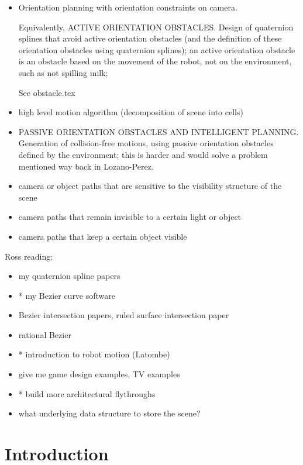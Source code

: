 \documentclass[12pt]{article}
\begin{document}
\begin{itemize}
\item Orientation planning with orientation constraints on camera.

Equivalently, ACTIVE ORIENTATION OBSTACLES.
Design of quaternion splines that avoid active orientation obstacles
(and the definition of these orientation obstacles using quaternion splines);
an active orientation obstacle is an obstacle based on the movement of the robot,
not on the environment, such as not spilling milk;

See obstacle.tex

\item high level motion algorithm (decomposition of scene into cells)

\item PASSIVE ORIENTATION OBSTACLES AND INTELLIGENT PLANNING.
Generation of collision-free motions, using
passive orientation obstacles defined by the environment; this is harder
and would solve a problem mentioned way back in Lozano-Perez.

\item camera or object paths that are sensitive to the visibility structure of the scene
\item camera paths that remain invisible to a certain light or object
\item camera paths that keep a certain object visible
\end{itemize}

Ross reading:
\begin{itemize}
\item my quaternion spline papers
\item * my Bezier curve software
\item Bezier intersection papers, ruled surface intersection paper
\item rational Bezier
\item * introduction to robot motion (Latombe)
\item give me game design examples, TV examples
\item * build more architectural flythroughs
\item what underlying data structure to store the scene?
\end{itemize}


\section{Introduction}
\end{document}

